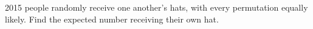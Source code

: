 2015 people randomly receive one another's hats, with every permutation equally likely. Find the expected number receiving their own hat.
